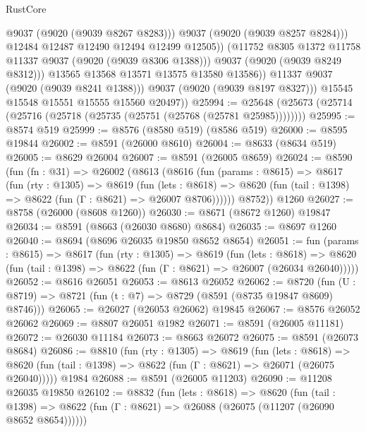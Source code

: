 \begin{lexlean}{RustCore}
\begin{coremodule}
                          @9037
                          (@9020 (@9039 @8267 @8283)))
                        @9037
                        (@9020 (@9039 @8257 @8284)))
                      @12484
                      @12487
                      @12490
                      @12494
                      @12499
                      @12505))
                  (@11752 @8305 @1372 @11758 @11337 @9037 (@9020 (@9039 @8306 @1388)))
                  @9037
                  (@9020 (@9039 @8249 @8312)))
                @13565
                @13568
                @13571
                @13575
                @13580
                @13586))
            @11337
            @9037
            (@9020 (@9039 @8241 @1388)))
          @9037
          (@9020 (@9039 @8197 @8327)))
        @15545
        @15548
        @15551
        @15555
        @15560
        @20497))
@25994 := @25648 (@25673 (@25714 (@25716 (@25718 (@25735 (@25751 (@25768 (@25781 @25985))))))))
@25995 := @8574 @519
@25999 := @8576 (@8580 @519) (@8586 @519)
@26000 := @8595 @19844
@26002 := @8591 (@26000 @8610)
@26004 := @8633 (@8634 @519)
@26005 := @8629 @26004
@26007 := @8591 (@26005 @8659)
@26024 := @8590
    (fun (fn : @31) =>
    @26002
      (@8613
        (@8616
          (fun (params : @8615) =>
          @8617
            (fun (rty : @1305) =>
            @8619
              (fun (lets : @8618) =>
              @8620 (fun (tail : @1398) => @8622 (fun (Γ : @8621) => @26007 @8706))))))
        @8752))
    @1260
@26027 := @8758 (@26000 (@8608 @1260))
@26030 := @8671 (@8672 @1260) @19847
@26034 := @8591 (@8663 (@26030 @8680) @8684)
@26035 := @8697 @1260
@26040 := @8694 (@8696 @26035 @19850 @8652 @8654)
@26051 := fun (params : @8615) =>
  @8617
    (fun (rty : @1305) =>
    @8619
      (fun (lets : @8618) =>
      @8620 (fun (tail : @1398) => @8622 (fun (Γ : @8621) => @26007 (@26034 @26040)))))
@26052 := @8616 @26051
@26053 := @8613 @26052
@26062 := @8720
    (fun (U : @8719) => @8721 (fun (t : @7) => @8729 (@8591 (@8735 @19847 @8609) @8746)))
@26065 := @26027 (@26053 @26062) @19845
@26067 := @8576 @26052 @26062
@26069 := @8807 @26051 @1982
@26071 := @8591 (@26005 @11181)
@26072 := @26030 @11184
@26073 := @8663 @26072
@26075 := @8591 (@26073 @8684)
@26086 := @8810
    (fun (rty : @1305) =>
    @8619
      (fun (lets : @8618) =>
      @8620 (fun (tail : @1398) => @8622 (fun (Γ : @8621) => @26071 (@26075 @26040)))))
    @1984
@26088 := @8591 (@26005 @11203)
@26090 := @11208 @26035 @19850
@26102 := @8832
    (fun (lets : @8618) =>
    @8620
      (fun (tail : @1398) =>
      @8622 (fun (Γ : @8621) => @26088 (@26075 (@11207 (@26090 @8652 @8654))))))

\end{coremodule}
\end{lexlean}
